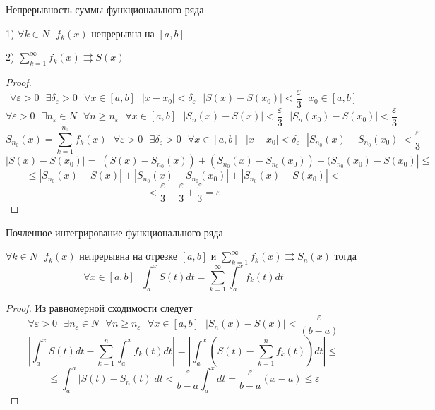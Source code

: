 \begin{title}[\Large]
  Непрерывность суммы функционального ряда
\end{title}

\begin{theorem}
  1) $\forall k \in N ~~~ f_k(x)$ непрерывна на $[a,b]$

  2) $\sum_{k=1}^{\infty} f_k (x) \rightrightarrows S(x)$
\end{theorem}

\begin{proof}
  $$
  \forall \varepsilon > 0 ~~~ \exists \delta_{\varepsilon} > 0 ~~~
  \forall x \in [a,b] ~~~ |x - x_0| < \delta_{\varepsilon} ~~~
  |S(x) - S(x_0)| < \frac{\varepsilon}{3} ~~~ x_0 \in [a,b]
  $$
  $$
  \forall \varepsilon > 0 ~~~ \exists n_{\varepsilon} \in N ~~~ \forall n \ge
  n_{\varepsilon} ~~~ \forall x \in [a,b] ~~~ |S_n(x) - S(x)| <
  \frac{\varepsilon}{3} ~~~ |S_n(x_0) - S(x_0)| < \frac{\varepsilon}{3}
  $$
  $$
  S_{n_0}(x) = \sum_{k=1}^{n_0} f_k(x) ~~~ \forall \varepsilon > 0 ~~~
  \exists \delta_{\varepsilon} > 0 ~~~ \forall x \in [a,b] ~~~ |x - x_0| <
  \delta_{\varepsilon} ~~~ |S_{n_0}(x) - S_{n_0}(x_0)| < \frac{\varepsilon}{3}
  $$
  $$
  |S(x) - S(x_0)| =  |(S(x) - S_{n_0}(x)) + (S_{n_0}(x) - S_{n_0}(x_0))
  + (S_{n_0}(x_0) - S(x_0)| \le
  $$
  $$
   \le |S_{n_0}(x) - S(x)| +
  |S_{n_0}(x) - S_{n_0}(x_0)| + |S_{n_0}(x) - S(x_0)| <
  $$
  $$
  < \frac{\varepsilon}{3} +
  \frac{\varepsilon}{3} + \frac{\varepsilon}{3} = \varepsilon
  $$
\end{proof}

\begin{title}[\Large]
  Почленное интегрирование функционального ряда
\end{title}

\begin{theorem}
  $\forall k \in N ~~~ f_k(x)$ непрерывна на отрезке $[a,b]$ и
  $\sum_{k=1}^{\infty} f_k(x) \rightrightarrows S_n(x)$ тогда
  $$
  \forall x \in [a,b] ~~~ \int_a^x S(t)dt =
  \sum_{k=1}^{\infty} \int_a^x f_k(t)dt
  $$
\end{theorem}

\begin{proof}
  Из равномерной сходимости следует
  $$
  \forall \varepsilon  > 0 ~~~ \exists n_{\varepsilon} \in N ~~~
  \forall n \ge n_{\varepsilon} ~~~ \forall x \in[a,b] ~~~
  |S_n(x) - S(x)| < \frac{\varepsilon}{(b-a)}
  $$
  $$
  \left| \int_a^x S(t)dt - \sum_{k=1}^n \int_a^x f_k(t)dt \right| =
  \left| \int_a^x \left( S(t) - \sum_{k=1}^n f_k(t) \right)dt \right| \le
  $$
  $$
  \le \int_a^a |S(t) - S_n(t)|dt < \frac{\varepsilon}{b-a} \int_a^x dt =
  \frac{\varepsilon}{b-a}(x-a) \le \varepsilon
  $$
\end{proof}

